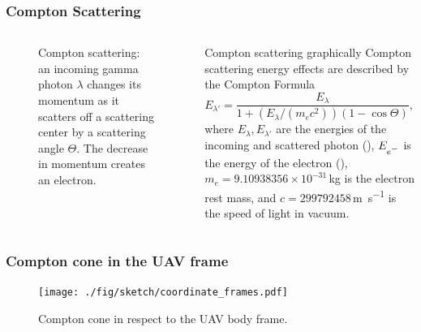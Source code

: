 \documentclass[aspectratio=169]{beamer}
\newcommand{\minus}{\scalebox{0.75}[1.0]{$-$}}
\begin{document}


\begin{frame}[noframenumbering]
  \frametitle{Compton Scattering}

  \begin{columns}[c]


  \begin{figure}[!t]
    \centering
    \resizebox{0.75\textwidth}{!}{%
      
    }
    \caption{
      Compton scattering: an incoming gamma photon $\lambda$ changes its momentum as it scatters off a scattering center by a scattering angle $\Theta$.
      The decrease in momentum creates an electron.
    }
    \label{fig:compton_scattering}
  \end{figure}


  \begin{block}{Compton scattering graphically}
  Compton scattering energy effects are described by the Compton Formula
  \begin{equation}
    E_{\lambda'} = \frac{E_{\lambda}}{1 + \left(E_{\lambda} / \left(m_e c^2\right)\right)\left(1 - \cos\Theta\right)},
    \label{eq:compton_formulae}
  \end{equation}
  where $E_{\lambda}, E_{\lambda'}$ are the energies of the incoming and scattered photon (\si{\joul}), $E_{e^{\minus}}$ is the energy of the electron (\si{\joul}), $m_e = 9.10938356\times10^{-31}\,$\si{\kilogram} is the electron rest mass, and $c = 299792458$\,\si{\meter\per\second} is the speed of light in vacuum.
  \end{block}

  \end{columns}

\end{frame}



\begin{frame}[noframenumbering]
\frametitle{Compton cone in the UAV frame}

\begin{figure}
  \texttt{[image: ./fig/sketch/coordinate\_frames.pdf]}
  \caption{Compton cone in respect to the UAV body frame.}
\end{figure}

\end{frame}
\end{document}
